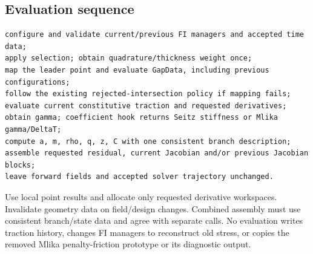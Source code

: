 \documentclass[11pt,a4paper]{article}
\begin{document}
\subsection{Evaluation sequence}
\begin{lstlisting}
configure and validate current/previous FI managers and accepted time data;
apply selection; obtain quadrature/thickness weight once;
map the leader point and evaluate GapData, including previous configurations;
follow the existing rejected-intersection policy if mapping fails;
evaluate current constitutive traction and requested derivatives;
obtain gamma; coefficient hook returns Seitz stiffness or Mlika gamma/DeltaT;
compute a, m, rho, q, z, C with one consistent branch description;
assemble requested residual, current Jacobian and/or previous Jacobian blocks;
leave forward fields and accepted solver trajectory unchanged.
\end{lstlisting}
Use local point results and allocate only requested derivative workspaces.
Invalidate geometry data on field/design changes. Combined assembly must use
consistent branch/state data and agree with separate calls. No evaluation writes
traction history, changes FI managers to reconstruct old stress, or copies the
removed Mlika penalty-friction prototype or its diagnostic output.
\end{document}
